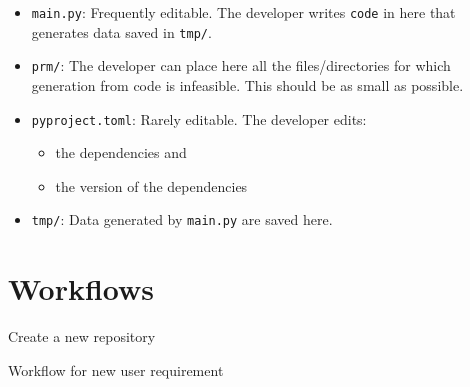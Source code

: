 \documentclass[journal]{IEEEtran}
\begin{document}
\begin{itemize}
\begin{itemize}
		\end{itemize}
	\item \texttt{main.py}: Frequently editable. The developer writes \texttt{code} in here that generates data saved in \texttt{tmp/}.
	\item \texttt{prm/}: The developer can place here all the files/directories for which generation from code is infeasible. This should be as small as possible.
	\item \texttt{pyproject.toml}: Rarely editable. The developer edits:
		\begin{itemize}
			\item the dependencies and
			\item the version of the dependencies
		\end{itemize}
	\item \texttt{tmp/}: Data generated by \texttt{main.py} are saved here.
\end{itemize}

\section{Workflows}

\begin{algorithm}
	Create a new repository\;
	\Return{}
	\caption{Workflow for new user requirement}
\end{algorithm}



\end{document}
